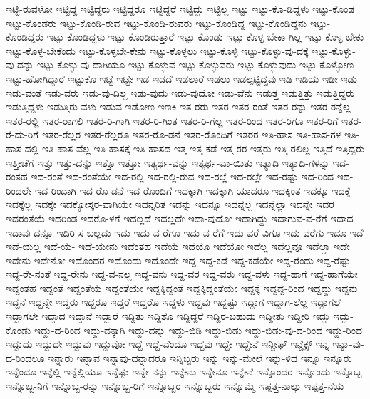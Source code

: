 {ಇಟ್ಟಿ-ರುವಳೋ
ಇಟ್ಟಿದ್ದ
ಇಟ್ಟಿದ್ದರು
ಇಟ್ಟಿದ್ದರೂ
ಇಟ್ಟಿದ್ದರೆ
ಇಟ್ಟಿದ್ದು
ಇಟ್ಟಿಲ್ಲ
ಇಟ್ಟು
ಇಟ್ಟು-ಕೊ-ಡಿದ್ದಳು
ಇಟ್ಟು-ಕೊಂಡ
ಇಟ್ಟು-ಕೊಂಡರು
ಇಟ್ಟು-ಕೊಂಡಿ-ರುವ
ಇಟ್ಟು-ಕೊಂಡಿ-ರುವರು
ಇಟ್ಟು-ಕೊಂಡಿದ್ದ
ಇಟ್ಟು-ಕೊಂಡಿದ್ದನು
ಇಟ್ಟು-ಕೊಂಡಿದ್ದರು
ಇಟ್ಟು-ಕೊಂಡಿದ್ದಳು
ಇಟ್ಟು-ಕೊಂಡಿರುತ್ತಾರೆ
ಇಟ್ಟು-ಕೊಂಡು
ಇಟ್ಟು-ಕೊಳ್ಳ-ಬೇಕಾ-ಗಿಲ್ಲ
ಇಟ್ಟು-ಕೊಳ್ಳ-ಬೇಕು
ಇಟ್ಟು-ಕೊಳ್ಳ-ಬೇಕೆಂದು
ಇಟ್ಟು-ಕೊಳ್ಳಬೇ-ಕೇನು
ಇಟ್ಟು-ಕೊಳ್ಳಲು
ಇಟ್ಟು-ಕೊಳ್ಳಿ
ಇಟ್ಟು-ಕೊಳ್ಳು-ವು-ದಕ್ಕೆ
ಇಟ್ಟು-ಕೊಳ್ಳು-ವು-ದನ್ನು
ಇಟ್ಟು-ಕೊಳ್ಳು-ವು-ದಾಗಿಯೂ
ಇಟ್ಟು-ಕೊಳ್ಳುವ
ಇಟ್ಟು-ಕೊಳ್ಳುವರು
ಇಟ್ಟು-ಕೊಳ್ಳುವುದು
ಇಟ್ಟು-ಕೊಳ್ಳೋಣ
ಇಟ್ಟು-ಹೋಗಿದ್ದಾರೆ
ಇಟ್ಟುಕೊ
ಇಟ್ಟೆ
ಇಟ್ಟೇ
ಇಡ
ಇಡದೆ
ಇಡಲಾರೆ
ಇಡಲು
ಇಡಲ್ಪಟ್ಟಿದ್ದವು
ಇಡಿ
ಇಡಿಯ
ಇಡೀ
ಇಡು
ಇಡು-ವಂತೆ
ಇಡು-ವರು
ಇಡು-ವು-ದಿಲ್ಲ
ಇಡು-ವುದು
ಇಡು-ವುದೋ
ಇಡು-ವೆನು
ಇಡುತ್ತ
ಇಡುತ್ತಿತ್ತು
ಇಡುತ್ತಿದ್ದರು
ಇಡುತ್ತಿದ್ದಳು
ಇಡುತ್ತಿರು-ವಳು
ಇಡುವ
ಇಡೋಣ
ಇಣಕಿ
ಇತ-ರರು
ಇತರ
ಇತರ-ರಂತೆ
ಇತರ-ರನ್ನು
ಇತರ-ರನ್ನೆಲ್ಲ
ಇತರ-ರಲ್ಲಿ
ಇತರ-ರಾಗಲಿ
ಇತರ-ರಿ-ಗಾಗಿ
ಇತರ-ರಿ-ಗಿಂತ
ಇತರ-ರಿ-ಗೆಲ್ಲ
ಇತರ-ರಿಂದ
ಇತರ-ರಿಗೂ
ಇತರ-ರಿಗೆ
ಇತರ-ರೆ-ದು-ರಿಗೆ
ಇತರ-ರೆಲ್ಲರ
ಇತರ-ರೆಲ್ಲರೂ
ಇತರ-ರೊ-ಡನೆ
ಇತರ-ರೊಂದಿಗೆ
ಇತರರ
ಇತಿ-ಹಾಸ
ಇತಿ-ಹಾಸ-ಗಳ
ಇತಿ-ಹಾಸ-ದಲ್ಲಿ
ಇತಿ-ಹಾಸ-ವೆಲ್ಲ
ಇತಿ-ಹಾಸಕ್ಕೆ
ಇತಿ-ಹಾಸದ
ಇತ್ತ
ಇತ್ತ-ಕಡೆ
ಇತ್ತ-ರರ
ಇತ್ತರು
ಇತ್ತಿ-ರಲಿಲ್ಲ
ಇತ್ತಿದೆ
ಇತ್ತಿದ್ದರು
ಇತ್ತೀಚೆಗೆ
ಇತ್ತು
ಇತ್ತು-ದನ್ನು
ಇತ್ತೊ
ಇತ್ತೋ
ಇತ್ಯರ್ಥ-ವನ್ನು
ಇತ್ಯರ್ಥ-ವಾ-ಯಿತು
ಇತ್ಯಾದಿ
ಇತ್ಯಾದಿ-ಗಳನ್ನು
ಇದ-ರಂತಹ
ಇದ-ರಂತೆ
ಇದ-ರಂತೆಯೇ
ಇದ-ರಲ್ಲಿ
ಇದ-ರಲ್ಲಿ-ರುವ
ಇದ-ರಲ್ಲೆ
ಇದ-ರಲ್ಲೇ
ಇದ-ರಷ್ಟು
ಇದ-ರಿಂದ
ಇದ-ರಿಂದಲೇ
ಇದ-ರಿಂದಾಗಿ
ಇದ-ರೊ-ಡನೆ
ಇದ-ರೊಂದಿಗೆ
ಇದಕ್ಕಾಗಿ
ಇದಕ್ಕಾಗಿ-ಯಾದರೂ
ಇದಕ್ಕಿಂತ
ಇದಕ್ಕೂ
ಇದಕ್ಕೆ
ಇದಕ್ಕೆಲ್ಲ
ಇದಕ್ಕೇ
ಇದಕ್ಕೋಸ್ಕರ-ವಾಗಿಯೇ
ಇದನ್ನರಿತ
ಇದನ್ನು
ಇದನ್ನೂ
ಇದನ್ನೆಲ್ಲ
ಇದನ್ನೆಲ್ಲಾ
ಇದನ್ನೇ
ಇದರ
ಇದರಂತೆಯೆ
ಇದರಿಂಡ
ಇದರೊ-ಳಗೆ
ಇದಲ್ಲದೆ
ಇದಲ್ಲದೇ
ಇದಾ-ವುದೋ
ಇದಾಗಿದ್ದು
ಇದಾಗುವ-ವ-ರೆಗೆ
ಇದಾದ
ಇದಾವು-ದನ್ನೂ
ಇದಿರಿ-ಸ-ಬಲ್ಲದು
ಇದು
ಇದು-ವ-ರೆಗೂ
ಇದು-ವ-ರೆಗೆ
ಇದು-ವರೆ-ವಿಗೂ
ಇದು-ವರೆಗು
ಇದೂ
ಇದೆ
ಇದೆ-ಯಲ್ಲ
ಇದೆ-ಯೆ-
ಇದೆ-ಯೇನು
ಇದೆಂತಹ
ಇದೆಯೆ
ಇದೆಯೊ
ಇದೆಯೋ
ಇದೆಲ್ಲ
ಇದೆಲ್ಲವೂ
ಇದೆಲ್ಲಾ
ಇದೇ
ಇದೇನು
ಇದೇನೋ
ಇದೊಂದರ
ಇದೊಂದು
ಇದೊಂದೇ
ಇದ್ದ
ಇದ್ದ-ಕಡೆ
ಇದ್ದ-ಕಡೆಯೇ
ಇದ್ದ-ರೆಂದು
ಇದ್ದ-ರೆಷ್ಟು
ಇದ್ದ-ರೇ-ನಂತೆ
ಇದ್ದ-ರೇನು
ಇದ್ದ-ವ-ನಲ್ಲ
ಇದ್ದ-ವನು
ಇದ್ದ-ವರ
ಇದ್ದ-ವರು
ಇದ್ದ-ವಳು
ಇದ್ದ-ಹಾಗೆ
ಇದ್ದ-ಹಾಗೆಯೇ
ಇದ್ದಂತಹ
ಇದ್ದಂತೆ
ಇದ್ದಂತೆಯೆ
ಇದ್ದಂತೆಯೇ
ಇದ್ದಕ್ಕಿದ್ದಂತೆ
ಇದ್ದಕ್ಕಿದ್ದಂತೆಯೇ
ಇದ್ದಕ್ಕೆ
ಇದ್ದದ್ದ-ರಿಂದ
ಇದ್ದದ್ದು
ಇದ್ದನು
ಇದ್ದನೆ
ಇದ್ದನ್ನೇ
ಇದ್ದರು
ಇದ್ದರೂ
ಇದ್ದರೆ
ಇದ್ದರೊ
ಇದ್ದಳು
ಇದ್ದವು
ಇದ್ದಷ್ಟು
ಇದ್ದಾಗ
ಇದ್ದಾಗ-ಲೆಲ್ಲ
ಇದ್ದಾಗಲೆ
ಇದ್ದಾಗಲೇ
ಇದ್ದಾದ
ಇದ್ದಾನೆ
ಇದ್ದಾರೆ
ಇದ್ದಿತು
ಇದ್ದಿತೊ
ಇದ್ದಿದ್ದರೆ
ಇದ್ದಿರ-ಬಹುದು
ಇದ್ದೀತು
ಇದ್ದೀರಿ
ಇದ್ದು
ಇದ್ದು-ಕೊಂಡು
ಇದ್ದು-ದ-ರಿಂದ
ಇದ್ದು-ದಕ್ಕಾಗಿ
ಇದ್ದು-ದನ್ನು
ಇದ್ದು-ಬಿಡಿ
ಇದ್ದು-ಬಿಡು
ಇದ್ದು-ಬಿಡು-ವು-ದ-ರಿಂದ
ಇದ್ದು-ರಿಂದ
ಇದ್ದುದು
ಇದ್ದುದೇ
ಇದ್ದುವು
ಇದ್ದುವೋ
ಇದ್ದೆ
ಇದ್ದೆ-ವೆಂದೂ
ಇದ್ದೆವು
ಇದ್ದೇ
ಇದ್ದೇನೆ
ಇನ್ಚೀಫ್
ಇನ್ಡೆಕ್ಸ್
ಇನ್ನ
ಇನ್ನಾ-ವು-ದ-ರಿಂದಲೂ
ಇನ್ನಾರು
ಇನ್ನಾವ
ಇನ್ನಾವು-ದನ್ನಾದರೂ
ಇನ್ನಿಬ್ಬರು
ಇನ್ನು
ಇನ್ನು-ಮೇಲೆ
ಇನ್ನು-ಳಿದ
ಇನ್ನೂ
ಇನ್ನೂರು
ಇನ್ನೆಂದೂ
ಇನ್ನೆಲ್ಲಿ
ಇನ್ನೆಲ್ಲಿಯೂ
ಇನ್ನೆಷ್ಟು
ಇನ್ನೇ-ನನ್ನು
ಇನ್ನೇನು
ಇನ್ನೇನೂ
ಇನ್ನೇನೆ
ಇನ್ನೊಂದರ
ಇನ್ನೊಂದು
ಇನ್ನೊಬ್ಬ
ಇನ್ನೊಬ್ಬ-ನಿಗೆ
ಇನ್ನೊಬ್ಬ-ರನ್ನು
ಇನ್ನೊಬ್ಬ-ರಿಗೆ
ಇನ್ನೊಬ್ಬರ
ಇನ್ನೊಬ್ಬರು
ಇನ್ನೊಮ್ಮೆ
ಇಪ್ಪತ್ತ-ನಾಲ್ಕು
ಇಪ್ಪತ್ತ-ನೆಯ
}
